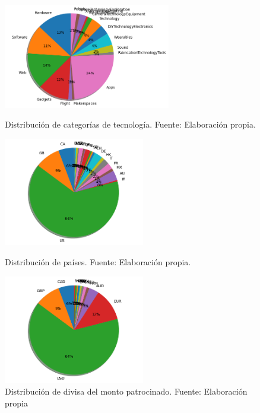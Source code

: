 \begin{figure}[htbp]
	\begin{center}
		\includegraphics[width=0.65\textwidth]{4/figures/category_distribution.png}
		\caption{Distribución de categorías de tecnología. Fuente: Elaboración propia.}
		\label{4:fig14}
		
		\includegraphics[width=0.55\textwidth]{4/figures/country_distribution.png}
		\caption{Distribución de países. Fuente: Elaboración propia.}
		\label{4:fig15}
		
		\includegraphics[width=0.55\textwidth]{4/figures/currency_distribution.png}
		\caption{Distribución de divisa del monto patrocinado. Fuente: Elaboración propia}
		\label{4:fig16}
	\end{center}
\end{figure}

